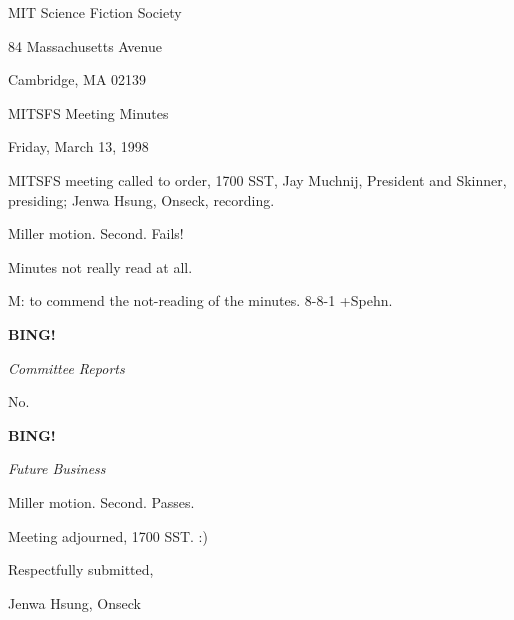 \documentclass[12pt]{article}
\newcommand{\bing}{{\bf BING!} }
\newcommand{\goto}[1]{\bing \vskip 12pt \centerline{{\em{#1}}}}
\begin{document}
\begin{center}

MIT Science Fiction Society 

84 Massachusetts Avenue

Cambridge, MA 02139

\vspace{12pt}

MITSFS Meeting Minutes 

Friday, March 13, 1998

\end{center}
 
\vspace{18pt}

\setlength{\parskip}{6pt}

\noindent
MITSFS meeting called to order, 1700 SST,
Jay Muchnij, President and Skinner, presiding; Jenwa Hsung, Onseck, recording.

Miller motion. Second. Fails!

Minutes not really read at all.

M: to commend the not-reading of the minutes. 8-8-1 +Spehn.

\goto{Committee Reports}

No.

\goto{Future Business}

Miller motion. Second. Passes.

\vspace{12pt}

\noindent
Meeting adjourned, 1700 SST. :)

\vspace{18pt}

\centerline{Respectfully submitted,}
\centerline{Jenwa Hsung, Onseck}
\end{document}
